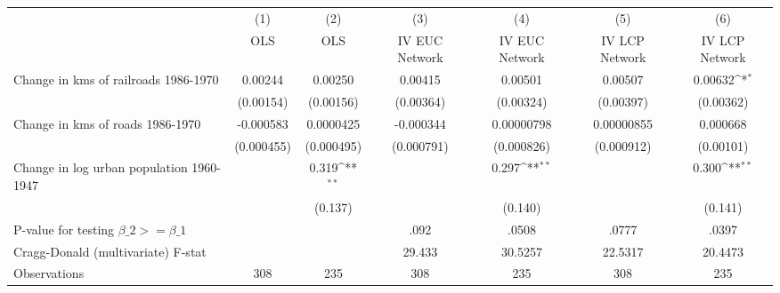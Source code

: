 {
\def\sym#1{\ifmmode^{#1}\else\(^{#1}\)\fi}
\begin{tabular}{l*{6}{c}}
\hline\hline
                &\multicolumn{1}{c}{(1)}&\multicolumn{1}{c}{(2)}&\multicolumn{1}{c}{(3)}&\multicolumn{1}{c}{(4)}&\multicolumn{1}{c}{(5)}&\multicolumn{1}{c}{(6)}\\
                &\multicolumn{1}{c}{OLS}&\multicolumn{1}{c}{OLS}&\multicolumn{1}{c}{IV EUC Network}&\multicolumn{1}{c}{IV EUC Network}&\multicolumn{1}{c}{IV LCP Network}&\multicolumn{1}{c}{IV LCP Network}\\
\hline
Change in kms of railroads 1986-1970&  0.00244         &  0.00250         &  0.00415         &  0.00501         &  0.00507         &  0.00632\sym{*}  \\
                &(0.00154)         &(0.00156)         &(0.00364)         &(0.00324)         &(0.00397)         &(0.00362)         \\
[1em]
Change in kms of roads 1986-1970&-0.000583         &0.0000425         &-0.000344         &0.00000798         &0.00000855         & 0.000668         \\
                &(0.000455)         &(0.000495)         &(0.000791)         &(0.000826)         &(0.000912)         &(0.00101)         \\
[1em]
Change in log urban population 1960-1947&                  &    0.319\sym{**} &                  &    0.297\sym{**} &                  &    0.300\sym{**} \\
                &                  &  (0.137)         &                  &  (0.140)         &                  &  (0.141)         \\
\hline
P-value for testing $\beta\_{2} >= \beta\_{1}$&                  &                  &     .092         &    .0508         &    .0777         &    .0397         \\
Cragg-Donald (multivariate) F-stat&                  &                  &   29.433         &  30.5257         &  22.5317         &  20.4473         \\
Observations    &      308         &      235         &      308         &      235         &      308         &      235         \\
\hline\hline
\end{tabular}
}
